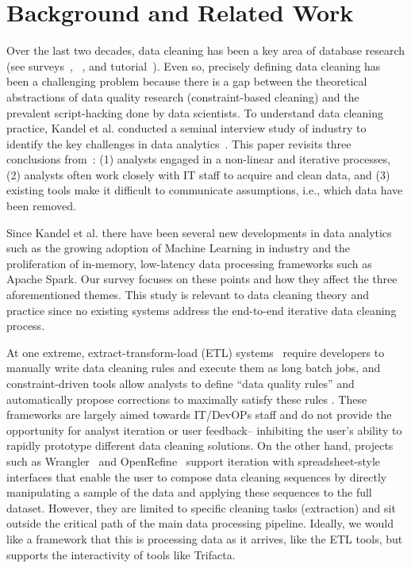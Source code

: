 \section{Background and Related Work}
Over the last two decades, data cleaning has been a key area of database research (see surveys~\cite{Dasu:2003:EDM:861869}, ~\cite{Rahm00datacleaning}, and tutorial~\cite{chu2016tut}).
Even so, precisely defining data cleaning has been a challenging problem because there is a gap between the theoretical abstractions of data quality research (constraint-based cleaning) and the prevalent script-hacking done by data scientists.
To understand data cleaning practice, Kandel et al. conducted a seminal interview study of industry to identify the key challenges in data analytics~\cite{kandel2012}. 
This paper revisits three conclusions from~\cite{kandel2012}: (1) analysts engaged in a non-linear and iterative processes, (2) analysts often work closely with IT staff to acquire and clean data, and (3) existing tools make it difficult to communicate assumptions, i.e., which data have been removed.

Since Kandel et al. there have been several new developments in data analytics such as the growing adoption of Machine Learning in industry and the proliferation of in-memory, low-latency data processing frameworks such as Apache Spark. 
Our survey focuses on these points and how they affect the three aforementioned themes.
This study is relevant to data cleaning theory and practice since no existing systems address the end-to-end iterative data cleaning process.

At one extreme, extract-transform-load (ETL) systems~\cite{informatica,talend,apachefalcon} require developers to manually write data cleaning rules and execute them as long batch jobs, 
and constraint-driven tools allow analysts to define ``data quality rules'' and automatically propose corrections to maximally satisfy these rules \cite{DBLP:conf/sigmod/DallachiesaEEEIOT13}.
These frameworks are largely aimed towards IT/DevOPs staff and do not provide the opportunity for analyst iteration or user feedback-- inhibiting the user's ability to rapidly prototype different data cleaning solutions.
On the other hand, projects such as Wrangler~\cite{wrangler,trifacta} and OpenRefine~\cite{openrefine} support iteration with spreadsheet-style interfaces that enable the user to compose data cleaning sequences by directly manipulating a sample of the data and applying these sequences to the full dataset.
However, they are limited to specific cleaning tasks (extraction) and sit outside the critical path of the main data processing pipeline. 
Ideally, we would like a framework that this is processing data as it arrives, like the ETL tools, but supports the interactivity of tools like Trifacta.

